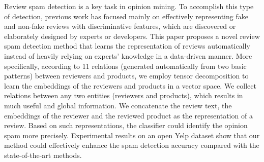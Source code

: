 Review spam detection is a key task in opinion mining. To accomplish this type of detection, previous work has focused mainly on effectively representing fake and non-fake reviews with discriminative features, which are discovered or elaborately designed by experts or developers. This paper proposes a novel review spam detection method that learns the representation of reviews automatically instead of heavily relying on experts' knowledge in a data-driven manner. More specifically, according to 11 relations (generated automatically from two basic patterns) between reviewers and products, we employ tensor decomposition to learn the embeddings of the reviewers and products in a vector space. We collect relations between any two entities (reviewers and products), which results in much useful and global information. We concatenate the review text, the embeddings of the reviewer and the reviewed product as the representation of a review. Based on such representations, the classifier could identify the opinion spam more precisely. Experimental results on an open Yelp dataset show that our method could effectively enhance the spam detection accuracy compared with the state-of-the-art methods.
